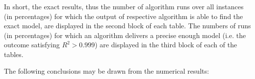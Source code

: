 \documentclass[a4paper,12pt]{elsarticle}
\begin{document}

In short, the exact results, thus the number of algorithm runs over all instances (in percentages) for which the output of respective algorithm is able to find the exact model, are displayed in the second block of each  table. The numbers of runs   (in percentages) for which an algorithm  delivers a precise enough model (i.e. the outcome satisfying $R^2>  0.999$) are displayed in the third block of each of the tables. 

The following conclusions may be drawn from the numerical results: 
\end{document}
